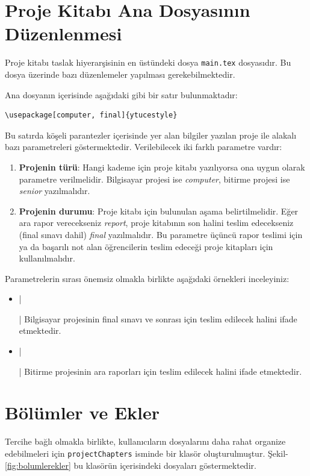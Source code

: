 \section{Proje Kitabı Ana Dosyasının Düzenlenmesi}\label{sc:Parametre}
Proje kitabı taslak hiyerarşisinin en üstündeki dosya \texttt{main.tex} dosyasıdır. Bu dosya üzerinde bazı düzenlemeler yapılması gerekebilmektedir.

Ana dosyanın içerisinde aşağıdaki gibi bir satır bulunmaktadır:

\begin{verbatim}
\usepackage[computer, final]{ytucestyle}
\end{verbatim}

Bu satırda köşeli parantezler içerisinde yer alan bilgiler yazılan proje ile alakalı bazı parametreleri göstermektedir. Verilebilecek iki farklı parametre vardır:

\begin{enumerate}
    \item \textbf{Projenin türü}: Hangi kademe için proje kitabı yazılıyorsa ona uygun olarak parametre verilmelidir. Bilgisayar projesi ise \textit{computer}, bitirme projesi ise \textit{senior} yazılmalıdır.
    
    \item \textbf{Projenin durumu}: Proje kitabı için bulunulan aşama belirtilmelidir. Eğer ara rapor verecekseniz \textit{report}, proje kitabının son halini teslim edecekseniz (final sınavı dahil) \textit{final} yazılmalıdır. Bu parametre üçüncü rapor teslimi için ya da başarılı not alan öğrencilerin teslim edeceği proje kitapları için kullanılmalıdır.
\end{enumerate}

Parametrelerin sırası önemsiz olmakla birlikte aşağıdaki örnekleri inceleyiniz:

\begin{itemize}
    \item {}|\usepackage[computer, final]{ytuthesis}| 
    Bilgisayar projesinin final sınavı ve sonrası için teslim edilecek halini ifade etmektedir.
    \item {}|\usepackage[senior, report]{ytuthesis}| 
    Bitirme projesinin ara raporları için teslim edilecek halini ifade etmektedir.
\end{itemize}

\section{Bölümler ve Ekler}
Tercihe bağlı olmakla birlikte, kullanıcıların dosyalarını daha rahat organize edebilmeleri için \texttt{projectChapters} isminde bir klasör oluşturulmuştur. Şekil-\ref{fig:bolumlerekler} bu klasörün içerisindeki dosyaları göstermektedir.


